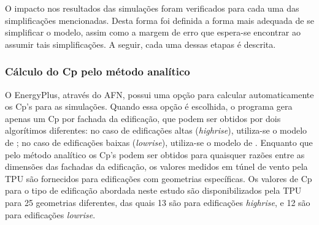 \documentclass[brazil,hardcopy,openany,a5paper]{ufscthesis}
\begin{document}
		O impacto nos resultados das simulações foram verificados para cada uma das simplificações mencionadas. Desta forma foi definida a forma mais adequada de se simplificar o modelo, assim como a margem de erro que espera-se encontrar ao assumir tais simplificações.
		A seguir, cada uma dessas etapas é descrita.
		
%		
%		
%		
		\subsubsection{Cálculo do Cp pelo método analítico}
		
		O EnergyPlus, através do AFN, possui uma opção para calcular automaticamente os Cp's para as simulações.
		Quando essa opção é escolhida, o programa gera apenas um Cp por fachada da edificação, que podem ser obtidos por dois algorítimos diferentes: no caso de edificações altas (\textit{highrise}), utiliza-se o modelo de  \cite{Atkins}; no caso de edificações baixas (\textit{lowrise}), utiliza-se o modelo de  \cite{SwamiChandra}.
		Enquanto que pelo método analítico os Cp's podem ser obtidos para quaisquer razões entre as dimensões das fachadas da edificação, os valores medidos em túnel de vento pela TPU são fornecidos para edificações com geometrias específicas.  %
		Os valores de Cp para o tipo de edificação abordada neste estudo são disponibilizados pela TPU para 25 geometrias diferentes, das quais 13 são para edificações \textit{highrise}, e 12 são para edificações \textit{lowrise}.
		
\end{document}
